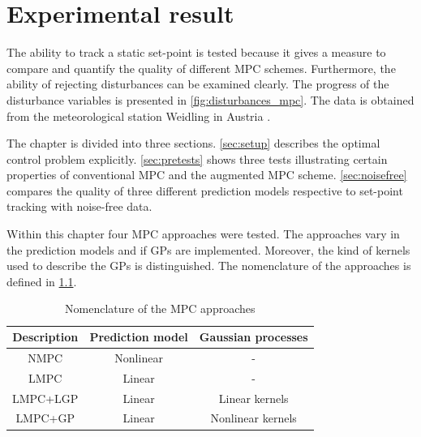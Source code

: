 \chapter{Experimental result}
\label{cha:experiment}
The ability to track a static set-point is tested because it gives a measure to compare and quantify the quality of different MPC schemes.
Furthermore, the ability of rejecting disturbances can be examined clearly.
The progress of the disturbance variables is presented in \cref{fig:disturbances_mpc}.
The data is obtained from the meteorological station Weidling in Austria \cite{Unfried.2016}.

The chapter is divided into three sections.
\cref{sec:setup} describes the optimal control problem explicitly.
\cref{sec:pretests} shows three tests illustrating certain properties of conventional MPC and the augmented MPC scheme.
\cref{sec:noisefree} compares the quality of three different prediction models respective to set-point tracking with noise-free data.

Within this chapter four MPC approaches were tested.
The approaches vary in the prediction models and if GPs are implemented.
Moreover, the kind of kernels used to describe the GPs is distinguished.
The nomenclature of the approaches is defined in \cref{tab:nomenclature_MPC}.

\begin{table}[b]
	\centering
		\begin{tabular}{ccc}
		Description   &  Prediction model     &  Gaussian processes                  \\\midrule
		NMPC          &  Nonlinear            &       -                              \\
		LMPC          &  Linear               &       -                              \\
		LMPC+LGP      &  Linear               &  Linear kernels                      \\
		LMPC+GP       &  Linear               &  Nonlinear kernels                   \\\bottomrule
		\end{tabular}
		\vspace{1mm}
	\caption{Nomenclature of the MPC approaches}
	\label{tab:nomenclature_MPC}
\end{table}

